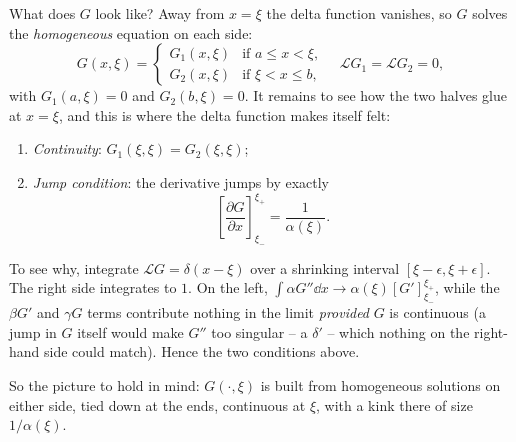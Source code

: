 \documentclass[a4paper]{scrartcl}
\begin{document}
What does $G$ look like? Away from $x = \xi$ the delta function vanishes, so $G$ solves the \emph{homogeneous} equation on each side:
$$
G(x, \xi) = \begin{cases}
    G_1(x, \xi) &\mbox{if } a \leq x < \xi, \\
    G_2(x, \xi) &\mbox{if } \xi < x \leq b,
\end{cases}
\quad \mathcal{L}G_1 = \mathcal{L}G_2 = 0,
$$
with $G_1(a, \xi) = 0$ and $G_2(b, \xi) = 0$. It remains to see how the two halves glue at $x = \xi$, and this is where the delta function makes itself felt:
\begin{enumerate}[label=(\roman*)]
    \item \emph{Continuity}: $G_1(\xi, \xi) = G_2(\xi, \xi)$;
    \item \emph{Jump condition}: the derivative jumps by exactly
    $$
    \left[\frac{\partial G}{\partial x}\right]_{\xi_-}^{\xi_+} = \frac{1}{\alpha(\xi)}.
    $$
\end{enumerate}
To see why, integrate $\mathcal{L}G = \delta(x - \xi)$ over a shrinking interval $[\xi - \epsilon, \xi + \epsilon]$. The right side integrates to $1$. On the left, $\int \alpha G'' \dd x \rightarrow \alpha(\xi) [G']^{\xi_+}_{\xi_-}$, while the $\beta G'$ and $\gamma G$ terms contribute nothing in the limit \emph{provided} $G$ is continuous (a jump in $G$ itself would make $G''$ too singular -- a $\delta'$ -- which nothing on the right-hand side could match). Hence the two conditions above.

So the picture to hold in mind: $G(\cdot, \xi)$ is built from homogeneous solutions on either side, tied down at the ends, continuous at $\xi$, with a kink there of size $1/\alpha(\xi)$.

\begin{center}
\end{center}
\end{document}
